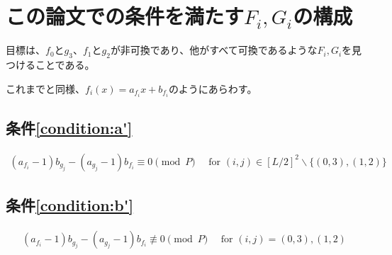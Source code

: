 \documentclass[a4paper,11pt,dvipdfmx]{jsarticle}
\theoremstyle{definition}
\begin{document}
\newpage
\section{この論文での条件を満たす\texorpdfstring{$F_i,G_i$}{Fi, Gi}の構成}
目標は、$f_0$と$g_3$、$f_1$と$g_2$が非可換であり、他がすべて可換であるような$F_i,G_i$を見つけることである。

これまでと同様、$f_i(x) = a_{f_i}x+b_{f_i}$のようにあらわす。
\subsection{条件\ref{condition:a'}}
\begin{align}
  (a_{f_i} - 1)b_{g_j} - (a_{g_j} - 1)b_{f_i} \equiv 0 \pmod P\quad\text{ for }(i,j)\in[L/2]^2\backslash\{(0,3),(1,2)\}\label{eq:01231}
\end{align}

\subsection{条件\ref{condition:b'}}
\begin{align}
  (a_{f_i} - 1)b_{g_j} - (a_{g_j} - 1)b_{f_i} \not\equiv 0 \pmod P\quad\text{ for }(i,j)=(0,3),(1,2)\label{eq:012312}
\end{align}
\end{document}
